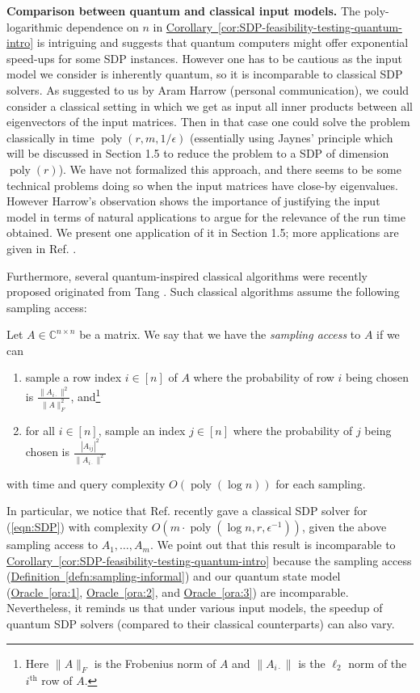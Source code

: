 \documentclass[a4paper,UKenglish,cleveref, autoref]{lipics-v2019}
\theoremstyle{remark}
\numberwithin{equation}{section}
\numberwithin{oracle}{section}
\numberwithin{remark}{section}
\newcommand{\eqn}[1]{(\ref{eqn:#1})}
\newcommand{\ora}[1]{\hyperref[ora:#1]{Oracle~\ref*{ora:#1}}}
\newcommand{\cor}[1]{\hyperref[cor:#1]{Corollary~\ref*{cor:#1}}}
\newcommand{\defn}[1]{\hyperref[defn:#1]{Definition~\ref*{defn:#1}}}
\newcommand{\C}{\ensuremath{\mathbb{C}}}
\DeclareMathOperator{\poly}{poly}
\newcommand{\hd}[1]{\vspace{2mm} \noindent \textbf{#1}}
\begin{document}
\hd{Comparison between quantum and classical input models.}
The poly-logarithmic dependence on $n$ in \cor{SDP-feasibility-testing-quantum-intro} is intriguing and suggests that quantum computers might offer exponential speed-ups for some SDP instances. However one has to be cautious as the input model we consider is inherently quantum, so it is incomparable to classical SDP solvers. As suggested to us by Aram Harrow (personal communication), we could consider a classical setting in which we get as input all inner products between all eigenvectors of the input matrices. Then in that case one could solve the problem classically in time $\poly(r, m, 1/\epsilon)$ (essentially using Jaynes' principle which will be discussed in Section 1.5 to reduce the problem to a SDP of dimension $\poly(r)$). We have not formalized this approach, and there seems to be some technical problems doing so when the input matrices have close-by eigenvalues. However Harrow's observation shows the importance of justifying the input model in terms of natural applications to argue for the relevance of the run time obtained. We present one application of it in Section 1.5; more applications are given in Ref. \cite{vAG18}.

Furthermore, several quantum-inspired classical algorithms were recently proposed originated from Tang \cite{tang2019quantum}. Such classical algorithms assume the following sampling access:
\begin{definition}\label{defn:sampling-informal}
  Let $A\in \C^{n \times n}$ be a matrix. We say that we have the \emph{sampling access} to $A$ if we can
  \begin{enumerate}
    \item\label{sample:row} sample a row index $i \in [n]$ of $A$ where the probability of row $i$ being chosen is $\frac{\|A_{i\cdot}\|^2}{\|A\|_{F}^2}$, and\footnote{Here $\|A\|_{F}$ is the Frobenius norm of $A$ and $\|A_{i\cdot}\|$ is the $\ell_{2}$ norm of the $i^{\text{th}}$ row of $A$.}
    \item\label{sample:element} for all $i \in [n]$, sample an index $j \in [n]$ where the probability of $j$ being chosen is $\frac{|A_{ij}|^2}{\|A_{i\cdot}\|^2}$
  \end{enumerate}
  with time and query complexity $O(\poly(\log n))$ for each sampling.
\end{definition}
In particular, we notice that Ref. \cite{chia2019quantum} recently gave a classical SDP solver for \eqn{SDP} with complexity $O(m\cdot\poly(\log n, r, \epsilon^{-1}))$, given the above sampling access to $A_{1},\ldots,A_{m}$. We point out that this result is incomparable to \cor{SDP-feasibility-testing-quantum-intro} because the sampling access (\defn{sampling-informal}) and our quantum state model (\ora{1}, \ora{2}, and \ora{3}) are incomparable. Nevertheless, it reminds us that under various input models, the speedup of quantum SDP solvers (compared to their classical counterparts) can also vary.
\end{document}
